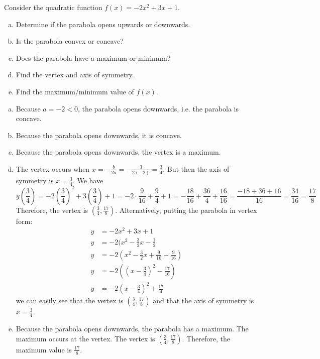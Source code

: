 \documentclass[11pt,letterpaper]{article}
\begin{document}
 Consider the quadratic function $f(x)= -2x^2 + 3x + 1$.
\begin{enumerate}[(a)]
\item Determine if the parabola opens upwards or downwards.
\item Is the parabola convex or concave?
\item Does the parabola have a maximum or minimum? 
\item Find the vertex and axis of symmetry. 
\item Find the maximum/minimum value of $f(x)$. 
\end{enumerate} \pspace

\sol
\begin{enumerate}[(a)]
\item Because $a= -2 < 0$, the parabola opens downwards, i.e. the parabola is concave. \pspace

\item Because the parabola opens downwards, it is concave. \pspace

\item Because the parabola opens downwards, the vertex is a maximum. \pspace

\item The vertex occurs when $x= -\frac{b}{2a}= -\frac{3}{2(-2)}= \frac{3}{4}$. But then the axis of symmetry is $x= \frac{3}{4}$. We have
	\[
	y\left( \frac{3}{4} \right)= -2\left( \frac{3}{4} \right)^2 + 3 \left( \frac{3}{4} \right) + 1= -2 \cdot \frac{9}{16} + \frac{9}{4} + 1= -\frac{18}{16} + \frac{36}{4} + \frac{16}{16}= \frac{-18 + 36 + 16}{16}= \frac{34}{16}= \frac{17}{8}
	\]
Therefore, the vertex is $(\frac{3}{4}, \frac{17}{8})$. Alternatively, putting the parabola in vertex form:
	\[
	\begin{aligned}
	y&= -2x^2 + 3x + 1 \\[0.3cm]
	y&= -2( x^2 - \frac{3}{2}x - \frac{1}{2} \\[0.3cm]
	y&= -2 \left( x^2 - \frac{3}{2}x + \frac{9}{16} - \frac{9}{16} \right) \\[0.3cm]
	y&= -2 \left( \left(x - \frac{3}{4} \right)^2 - \frac{17}{16} \right) \\[0.3cm]
	y&= -2 \left(x - \frac{3}{4} \right)^2 + \frac{17}{4}
	\end{aligned}
	\]
we can easily see that the vertex is $(\frac{3}{4}, \frac{17}{8})$ and that the axis of symmetry is $x= \frac{3}{4}$. \pspace

\item Because the parabola opens downwards, the parabola has a maximum. The maximum occurs at the vertex. The vertex is $(\frac{3}{4}, \frac{17}{8})$. Therefore, the maximum value is $\frac{17}{8}$. 
\end{enumerate}


\end{document}
